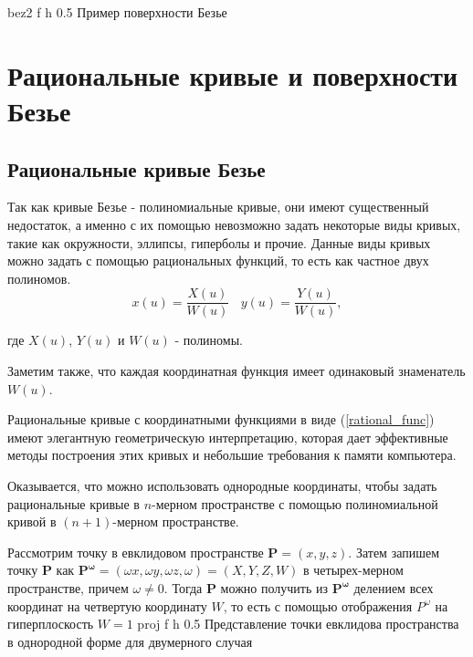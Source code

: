 \documentclass{bmstu}
\begin{document}
{bez2} %
{f} %
{h} %
{0.5\textwidth} %
{Пример поверхности Безье} %

\section{Рациональные кривые и поверхности Безье}
\subsection{Рациональные кривые Безье}

Так как кривые Безье - полиномиальные кривые, они имеют существенный недостаток, а именно с их помощью невозможно задать некоторые виды кривых, такие как окружности, эллипсы, гиперболы и прочие. Данные виды кривых можно задать с помощью рациональных функций, то есть как частное двух полиномов.
\begin{equation}\label{rational_func}
    x(u) = \frac{X(u)}{W(u)}~~~~y(u) = \frac{Y(u)}{W(u)},
\end{equation}

где $X(u)$, $Y(u)$ и $W(u)$ - полиномы.

Заметим также, что каждая координатная функция имеет одинаковый знаменатель $W(u)$.

Рациональные кривые с координатными функциями в виде (\ref{rational_func}) имеют элегантную геометрическую интерпретацию, которая дает эффективные методы построения этих кривых и небольшие требования к памяти компьютера.

Оказывается, что можно использовать однородные координаты, чтобы задать рациональные кривые в $n$-мерном пространстве с помощью полиномиальной кривой в $(n+1)$-мерном пространстве.

Рассмотрим точку в евклидовом пространстве $\mathbf{P} = (x,y,z)$. Затем запишем точку $\mathbf{P}$ как $\mathbf{P^\omega}=(\omega x, \omega y, \omega z, \omega)=(X, Y, Z, W)$ в четырех-мерном пространстве, причем $\omega \neq 0$. Тогда $\mathbf{P}$ можно получить из $\mathbf{P^\omega}$ делением всех координат на четвертую координату $W$, то есть с помощью отображения $P^\omega$ на гиперплоскость $W=1$
{proj} %
{f} %
{h} %
{0.5\textwidth} %
{Представление точки евклидова пространства в однородной форме для двумерного случая} %
\end{document}
